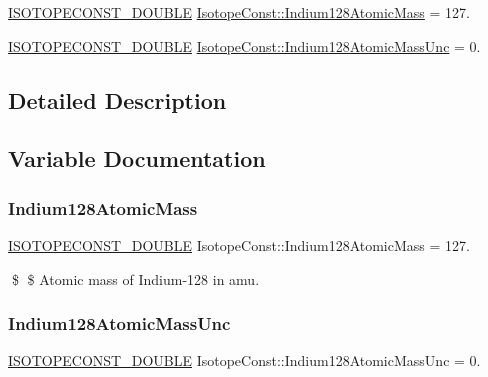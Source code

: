 \begin{DoxyCompactItemize}
\item 
\mbox{\hyperlink{group___isotope_const-_macros_ga8f45a7272ce02c0b4c65c44636ed719a}{I\+S\+O\+T\+O\+P\+E\+C\+O\+N\+S\+T\+\_\+\+D\+O\+U\+B\+LE}} \mbox{\hyperlink{group___isotope_const-_indium-_in128_ga6029cd6af3e266c45322b0239e66a09f}{Isotope\+Const\+::\+Indium128\+Atomic\+Mass}} = 127.
\item 
\mbox{\hyperlink{group___isotope_const-_macros_ga8f45a7272ce02c0b4c65c44636ed719a}{I\+S\+O\+T\+O\+P\+E\+C\+O\+N\+S\+T\+\_\+\+D\+O\+U\+B\+LE}} \mbox{\hyperlink{group___isotope_const-_indium-_in128_gab4aa953f37c568c7680ddd8603d30adf}{Isotope\+Const\+::\+Indium128\+Atomic\+Mass\+Unc}} = 0.
\end{DoxyCompactItemize}


\subsection{Detailed Description}


\subsection{Variable Documentation}
\mbox{\label{group___isotope_const-_indium-_in128_ga6029cd6af3e266c45322b0239e66a09f}} 
\subsubsection{\texorpdfstring{Indium128\+Atomic\+Mass}{Indium128AtomicMass}}
{\footnotesize\ttfamily \mbox{\hyperlink{group___isotope_const-_macros_ga8f45a7272ce02c0b4c65c44636ed719a}{I\+S\+O\+T\+O\+P\+E\+C\+O\+N\+S\+T\+\_\+\+D\+O\+U\+B\+LE}} Isotope\+Const\+::\+Indium128\+Atomic\+Mass = 127.}

\$ \$ Atomic mass of Indium-\/128 in amu. \mbox{\label{group___isotope_const-_indium-_in128_gab4aa953f37c568c7680ddd8603d30adf}} 
\subsubsection{\texorpdfstring{Indium128\+Atomic\+Mass\+Unc}{Indium128AtomicMassUnc}}
{\footnotesize\ttfamily \mbox{\hyperlink{group___isotope_const-_macros_ga8f45a7272ce02c0b4c65c44636ed719a}{I\+S\+O\+T\+O\+P\+E\+C\+O\+N\+S\+T\+\_\+\+D\+O\+U\+B\+LE}} Isotope\+Const\+::\+Indium128\+Atomic\+Mass\+Unc = 0.}

